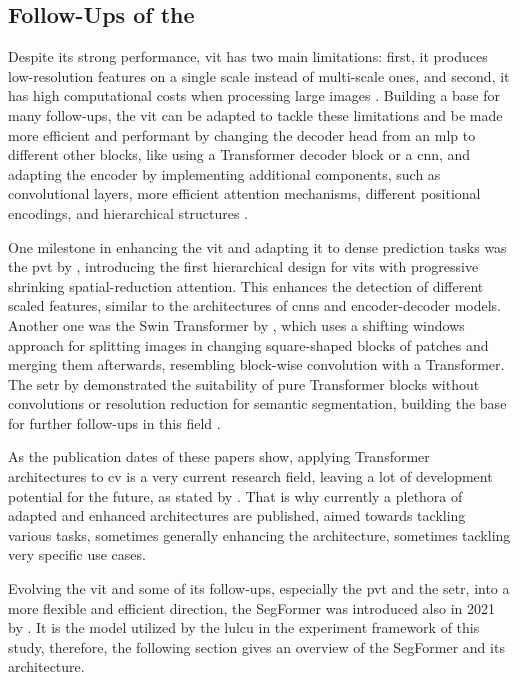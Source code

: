\subsection{Follow-Ups of the }

Despite its strong performance, \gls{vit} has two main limitations: first, it produces low-resolution features on a single scale instead of multi-scale ones, and second, it has high computational costs when processing large images \autocite{Xie.Wang.ea2021}. Building a base for many follow-ups, the \gls{vit} can be adapted to tackle these limitations and be made more efficient and performant by changing the decoder head from an \gls{mlp} to different other blocks, like using a Transformer decoder block or a \gls{cnn}, and adapting the encoder by implementing additional components, such as convolutional layers, more efficient attention mechanisms, different positional encodings, and hierarchical structures \autocite{Han.Wang.ea2023,Khan.Naseer.ea2021}.

One milestone in enhancing the \gls{vit} and adapting it to dense prediction tasks was the \gls{pvt} by \textcite{Wang.Xie.ea2021}, introducing the first hierarchical design for \glspl{vit} with progressive shrinking spatial-reduction attention. This enhances the detection of different scaled features, similar to the architectures of \glspl{cnn} and encoder-decoder models. Another one was the Swin Transformer by \textcite{Liu.Lin.ea2021}, which uses a shifting windows approach for splitting images in changing square-shaped blocks of patches and merging them afterwards, resembling block-wise convolution with a Transformer. The \gls{setr} by \textcite{Zheng.Lu.ea2021} demonstrated the suitability of pure Transformer blocks without convolutions or resolution reduction for semantic segmentation, building the base for further follow-ups in this field \autocite{Han.Wang.ea2023,Khan.Naseer.ea2021,Xie.Wang.ea2021}.

As the publication dates of these papers show, applying Transformer architectures to \gls{cv} is a very current research field, leaving a lot of development potential for the future, as stated by \textcite{Digra.Dhir.ea2022,Moharram.Sundaram2023,Tzepkenlis.Marthoglou.ea2023,Xie.Wang.ea2021}. That is why currently a plethora of adapted and enhanced architectures are published, aimed towards tackling various tasks, sometimes generally enhancing the architecture, sometimes tackling very specific use cases.

Evolving the \gls{vit} and some of its follow-ups, especially the \gls{pvt} and the \gls{setr}, into a more flexible and efficient direction, the SegFormer was introduced also in 2021 by \textcite{Xie.Wang.ea2021}. It is the model utilized by the \gls{lulcu} in the experiment framework of this study, therefore, the following section gives an overview of the SegFormer and its architecture.

